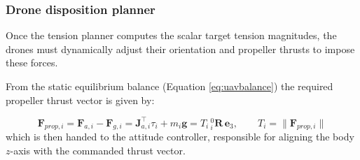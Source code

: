 \subsubsection{Drone disposition planner}
Once the tension planner computes the scalar target tension magnitudes, the drones must dynamically adjust their orientation and propeller thrusts to impose these forces. 

From the static equilibrium balance (Equation \ref{eq:uavbalance}) the required propeller thrust vector is given by:

\begin{equation}
    \mathbf{F}_{prop,i} = \mathbf{F}_{a,i} - \mathbf{F}_{g,i} = \mathbf{J}_{a,i}^\top \tau_i + m_i \mathbf{g} = T_i \,^0_i\mathbf{R}\,\mathbf{e}_3, \qquad T_i = \lVert \mathbf{F}_{prop,i} \rVert
    \label{eq:drone-disposition}
\end{equation}
which is then handed to the attitude controller, responsible for aligning the body $z$-axis with the commanded thrust vector.





